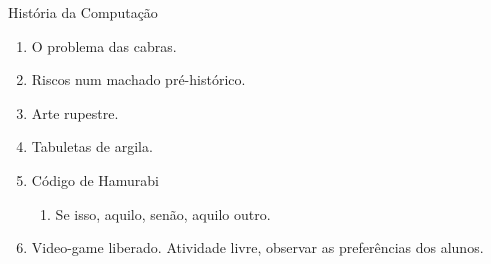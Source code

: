 {\LARGE História da Computação}
\begin{enumerate}
	\item O problema das cabras.
	\item Riscos num machado pré-histórico.
	\item Arte rupestre.
	\item Tabuletas de argila.
	\item Código de Hamurabi
	\begin{enumerate}
		\item Se isso, aquilo, senão, aquilo outro.
	\end{enumerate}
	\item Video-game liberado. Atividade livre, observar as preferências dos alunos.
\end{enumerate}
